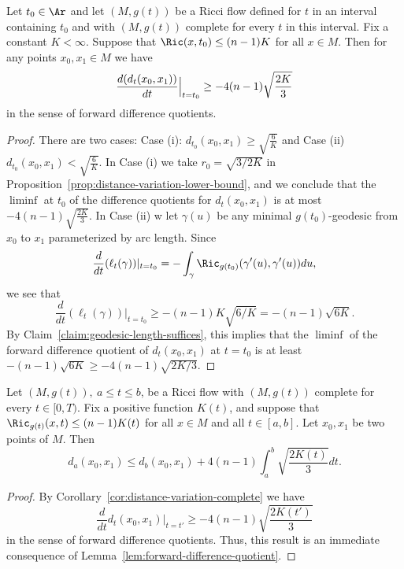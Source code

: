 \begin{corollary}\label{cor:distance-variation-complete}
\label{2ndI.8.3}
Let $t_0\in \Ar$ and let $(M,g(t))$ be a Ricci flow defined for $t$ in an
interval
containing $t_0$ and with $(M,g(t))$ complete for every $t$ in this
interval. Fix a constant $K<\infty$. Suppose that $\Ric(x,t_0)\le (n-1)K$
for all $x\in M$.
 Then for any points $x_0,x_1\in M$ we have
$$\frac{d(d_t(x_0,x_1))}{dt}\Bigl|_{t=t_0}\Bigr.\ge -4(n-1)\sqrt{\frac{2K}{3}}$$
in the sense of forward difference quotients.
\end{corollary}

\begin{proof}
There are two cases: Case (i): $d_{t_0}(x_0,x_1)\ge
\sqrt{\frac{6}{K}}$ and Case (ii) $d_{t_0}(x_0,x_1)<
\sqrt{\frac{6}{K}}$. In Case (i) we  take $r_0=\sqrt{3/2K}$ in
Proposition~\ref{prop:distance-variation-lower-bound}, and we conclude that the $\liminf$ at
$t_0$ of the difference quotients for $d_{t}(x_0,x_1)$ is at most
$-4(n-1)\sqrt{\frac{2K}{3}}$. In Case (ii) w let $\gamma(u)$ be any
minimal $g(t_0)$-geodesic from $x_0$ to $x_1$ parameterized by arc
length. Since
$$\frac{d}{dt}(\ell_t(\gamma))|_{t=t_0}=-\int_\gamma
\Ric_{g(t_0)}(\gamma'(u),\gamma'(u))du,$$ we see that
$$\frac{d}{dt}(\ell_t(\gamma))|_{t=t_0}\ge
-(n-1)K\sqrt{6/K}=-(n-1)\sqrt{6K}.$$ By Claim~\ref{claim:geodesic-length-suffices}, this
implies that the $\liminf$ of the forward difference quotient of
$d_t(x_0,x_1)$ at $t=t_0$ is at least $-(n-1)\sqrt{6K}\ge
-4(n-1)\sqrt{2K/3}$.
\end{proof}



\begin{corollary}\label{cor:distance-integral-bound}
\label{corI.8.3}
 Let $(M,g(t)),\ a\le t\le b$, be a Ricci flow with $(M,g(t))$ complete for every $t
\in [0,T)$. Fix a positive function $K(t)$, and suppose that $\Ric_{g(t)}(x,t)\le (n-1)K(t)$ for all $x\in M$ and all $t\in [a,b]$. Let
$x_0,x_1$ be two points of $M$. Then
$$d_a(x_0,x_1)\le d_b(x_0,x_1)+4(n-1)\int_a^b\sqrt{\frac{2K(t)}{3}}dt.$$
\end{corollary}


\begin{proof}
By Corollary~\ref{cor:distance-variation-complete} we have
\begin{equation}\label{liminf}
\frac{d}{dt}d_t(x_0,x_1)|_{t=t'}\ge -4(n-1)\sqrt{\frac{2K(t')}{3}}
\end{equation}
in the sense  of forward difference quotients. Thus, this result is
an immediate consequence of Lemma~\ref{lem:forward-difference-quotient}.
\end{proof}


